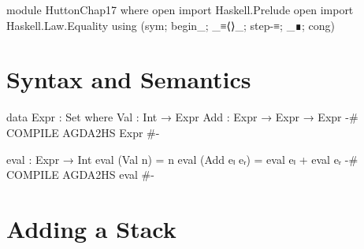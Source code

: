 \documentclass{article}
\begin{document}
\begin{code}
module HuttonChap17 where
open import Haskell.Prelude
open import Haskell.Law.Equality using (sym; begin_; _≡⟨⟩_; step-≡; _∎; cong)
\end{code}

\section{Syntax and Semantics}

\begin{code}
data Expr : Set where
    Val : Int → Expr
    Add : Expr → Expr → Expr
{-# COMPILE AGDA2HS Expr #-}

eval : Expr → Int
eval (Val n) = n
eval (Add eₗ eᵣ) = eval eₗ + eval eᵣ
{-# COMPILE AGDA2HS eval #-}
\end{code}

\section{Adding a Stack}
\end{document}
